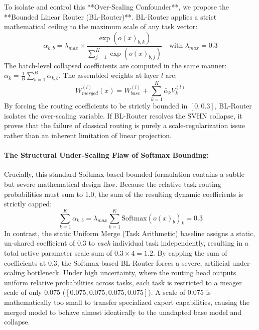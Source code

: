To isolate and control this **Over-Scaling Confounder**, we propose the **Bounded Linear Router (BL-Router)**. BL-Router applies a strict mathematical ceiling to the maximum scale of any task vector:
\begin{equation}
    \alpha_{k, b} = \lambda_{max} \times \frac{\exp(o(x)_{b, k})}{\sum_{j=1}^K \exp(o(x)_{b, j})} \quad \text{with } \lambda_{max} = 0.3
\end{equation}
The batch-level collapsed coefficients are computed in the same manner: $\bar{\alpha}_k = \frac{1}{B} \sum_{b=1}^B \alpha_{k, b}$. The assembled weights at layer $l$ are:
\begin{equation}
    W_{merged}^{(l)}(x) = W_{base}^{(l)} + \sum_{k=1}^K \bar{\alpha}_k V_k^{(l)}
\end{equation}
By forcing the routing coefficients to be strictly bounded in $[0, 0.3]$, BL-Router isolates the over-scaling variable. If BL-Router resolves the SVHN collapse, it proves that the failure of classical routing is purely a scale-regularization issue rather than an inherent limitation of linear projection.

\paragraph{The Structural Under-Scaling Flaw of Softmax Bounding:}
Crucially, this standard Softmax-based bounded formulation contains a subtle but severe mathematical design flaw. Because the relative task routing probabilities must sum to $1.0$, the sum of the resulting dynamic coefficients is strictly capped:
\begin{equation}
    \sum_{k=1}^K \alpha_{k, b} = \lambda_{max} \sum_{k=1}^K \text{Softmax}(o(x)_b)_k = 0.3
\end{equation}
In contrast, the static Uniform Merge (Task Arithmetic) baseline assigns a static, un-shared coefficient of $0.3$ to \textit{each} individual task independently, resulting in a total active parameter scale sum of $0.3 \times 4 = 1.2$. 
By capping the sum of coefficients at $0.3$, the Softmax-based BL-Router forces a severe, artificial under-scaling bottleneck. Under high uncertainty, where the routing head outputs uniform relative probabilities across tasks, each task is restricted to a meager scale of only $0.075$ ($[0.075, 0.075, 0.075, 0.075]$). A scale of $0.075$ is mathematically too small to transfer specialized expert capabilities, causing the merged model to behave almost identically to the unadapted base model and collapse.

